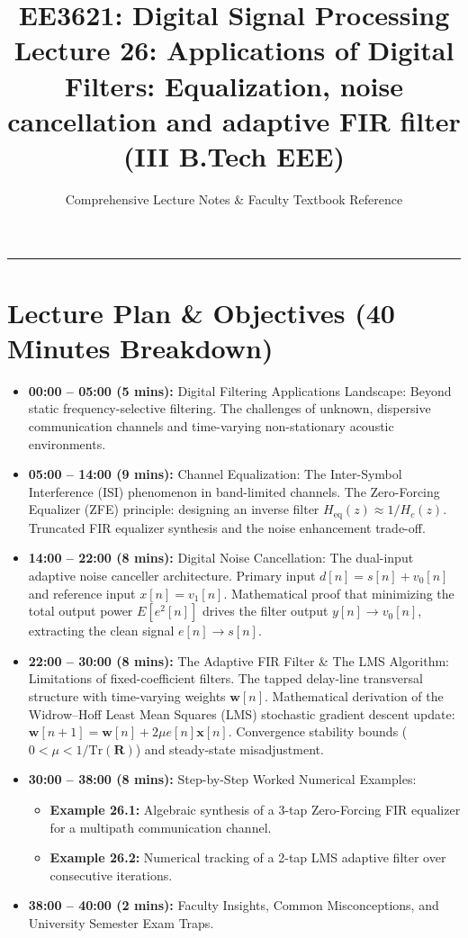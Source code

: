 \documentclass[11pt,a4paper]{article}
\title{\textbf{EE3621: Digital Signal Processing} \\ \Large Lecture 26: Applications of Digital Filters: Equalization, noise cancellation and adaptive FIR filter \\ \large (III B.Tech EEE)}
\author{Comprehensive Lecture Notes \& Faculty Textbook Reference}
\date{}
\begin{document}
\maketitle

\noindent\rule{\textwidth}{0.5pt}

\section*{Lecture Plan \& Objectives (40 Minutes Breakdown)}
\begin{itemize}
    \item \textbf{00:00 -- 05:00 (5 mins):} Digital Filtering Applications Landscape: Beyond static frequency-selective filtering. The challenges of unknown, dispersive communication channels and time-varying non-stationary acoustic environments.
    \item \textbf{05:00 -- 14:00 (9 mins):} Channel Equalization: The Inter-Symbol Interference (ISI) phenomenon in band-limited channels. The Zero-Forcing Equalizer (ZFE) principle: designing an inverse filter $H_{\text{eq}}(z) \approx 1/H_c(z)$. Truncated FIR equalizer synthesis and the noise enhancement trade-off.
    \item \textbf{14:00 -- 22:00 (8 mins):} Digital Noise Cancellation: The dual-input adaptive noise canceller architecture. Primary input $d[n] = s[n] + v_0[n]$ and reference input $x[n] = v_1[n]$. Mathematical proof that minimizing the total output power $E[e^2[n]]$ drives the filter output $y[n] \to v_0[n]$, extracting the clean signal $e[n] \to s[n]$.
    \item \textbf{22:00 -- 30:00 (8 mins):} The Adaptive FIR Filter \& The LMS Algorithm: Limitations of fixed-coefficient filters. The tapped delay-line transversal structure with time-varying weights $\mathbf{w}[n]$. Mathematical derivation of the Widrow--Hoff Least Mean Squares (LMS) stochastic gradient descent update: $\mathbf{w}[n+1] = \mathbf{w}[n] + 2\mu e[n] \mathbf{x}[n]$. Convergence stability bounds ($0 < \mu < 1/\text{Tr}(\mathbf{R})$) and steady-state misadjustment.
    \item \textbf{30:00 -- 38:00 (8 mins):} Step-by-Step Worked Numerical Examples:
    \begin{itemize}
        \item \textbf{Example 26.1:} Algebraic synthesis of a 3-tap Zero-Forcing FIR equalizer for a multipath communication channel.
        \item \textbf{Example 26.2:} Numerical tracking of a 2-tap LMS adaptive filter over consecutive iterations.
    \end{itemize}
    \item \textbf{38:00 -- 40:00 (2 mins):} Faculty Insights, Common Misconceptions, and University Semester Exam Traps.
\end{itemize}
\end{document}
